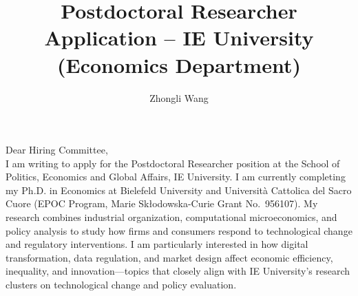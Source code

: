 \documentclass{nfr}
\title{Postdoctoral Researcher Application – IE University (Economics Department)}
\author{Zhongli Wang}
\begin{document}

% 
% 
% 
% 


\maketitle


\noindent Dear Hiring Committee,\\[0.2cm]

I am writing to apply for the Postdoctoral Researcher position at the School of Politics, Economics and Global Affairs, IE University. 
I am currently completing my Ph.D. in Economics at Bielefeld University and Università Cattolica del Sacro Cuore (EPOC Program, Marie Skłodowska-Curie Grant No.~956107). 
My research combines industrial organization, computational microeconomics, and policy analysis to study how firms and consumers respond to technological change and regulatory interventions. 
I am particularly interested in how digital transformation, data regulation, and market design affect economic efficiency, inequality, and innovation—topics that closely align with IE University’s research clusters on technological change and policy evaluation.\\
\end{document}
